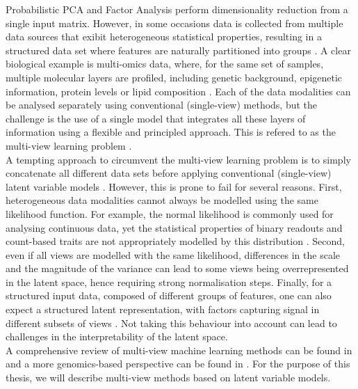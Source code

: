 Probabilistic PCA and Factor Analysis perform dimensionality reduction from a single input matrix. However, in some occasions data is collected from multiple data sources that exibit heterogeneous statistical properties, resulting in a structured data set where features are naturally partitioned into groups \cite{Xu2013,Li2016,Zeng2018}. A clear biological example is multi-omics data, where, for the same set of samples, multiple molecular layers are profiled, including genetic background, epigenetic information, protein levels or lipid composition \cite{Huang2017b,Hasin2017b}. Each of the data modalities can be analysed separately using conventional (single-view) methods, but the challenge is the use of a single model that integrates all these layers of information using a flexible and principled approach. This is refered to as the multi-view learning problem \cite{Xu2013,Li2016}.\\
A tempting approach to circumvent the multi-view learning problem is to simply concatenate all different data sets before applying conventional (single-view) latent variable models \cite{Ritchie2015}. However, this is prone to fail for several reasons. First, heterogeneous data modalities cannot always be modelled using the same likelihood function. For example, the normal likelihood is commonly used for analysing continuous data, yet the statistical properties of binary readouts and count-based traits are not appropriately modelled by this distribution \cite{Pilling2018}. Second, even if all views are modelled with the same likelihood, differences in the scale and the magnitude of the variance can lead to some views being overrepresented in the latent space, hence requiring strong normalisation steps. Finally, for a structured input data, composed of different groups of features, one can also expect a structured latent representation, with factors capturing signal in different subsets of views \cite{Virtanen2012,Klami2015}. Not taking this behaviour into account can lead to challenges in the interpretability of the latent space.\\

A comprehensive review of multi-view machine learning methods can be found in \cite{Xu2013} and a more genomics-based perspective can be found in \cite{Ritchie2015}. For the purpose of this thesis, we will describe multi-view methods based on latent variable models.

